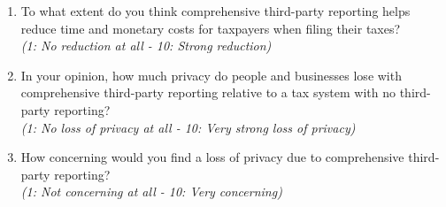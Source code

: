 \documentclass[11pt]{article}
\begin{document}
\begin{enumerate}[resume]
    \item To what extent do you think comprehensive third-party reporting helps reduce time and monetary costs for taxpayers when filing their taxes?\\
    \textit{(1: No reduction at all - 10: Strong reduction)}
    \item In your opinion, how much privacy do people and businesses lose with comprehensive third-party reporting relative to a tax system with no third-party reporting?\\
    \textit{(1: No loss of privacy at all - 10: Very strong loss of privacy)}
    \item How concerning would you find a loss of privacy due to comprehensive third-party reporting?\\
    \textit{(1: Not concerning at all - 10: Very concerning)}
\end{enumerate}
\end{document}
